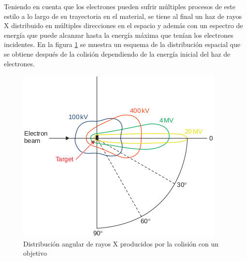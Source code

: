 Teniendo en cuenta que los electrones pueden sufrir múltiples procesos de este estilo a lo largo de su trayectoria en el material, se tiene al final un haz de rayos X distribuido en múltiples direcciones en el espacio y además con un espectro de energía que puede alcanzar hasta la energía máxima que tenían los electrones incidentes. En la figura \ref{fig:distribucionAngular} se muestra un esquema de la distribución espacial que se obtiene después de la colisión dependiendo de la energía inicial del haz de electrones. \\

\begin{figure}[H]
	\centering
	\includegraphics[width=0.7\linewidth]{images/distribucionAngular.png}
	\caption{Distribución angular de rayos X producidos por la colisión con un objetivo}
	\label{fig:distribucionAngular}
\end{figure}

